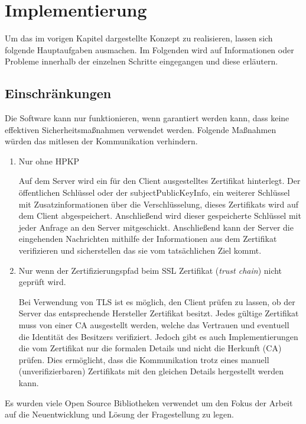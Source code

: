 \chapter{Implementierung}

Um das im vorigen Kapitel dargestellte Konzept zu realisieren, lassen sich folgende Hauptaufgaben ausmachen. Im Folgenden wird auf Informationen oder Probleme innerhalb der einzelnen Schritte eingegangen und diese erläutern.

\section{Einschränkungen}
Die Software kann nur funktionieren, wenn garantiert werden kann, dass keine effektiven Sicherheitsmaßnahmen verwendet werden. Folgende Maßnahmen würden das mitlesen der Kommunikation verhindern.
\begin{enumerate}
    \item Nur ohne \ac{HPKP} %
    
    Auf dem Server wird ein für den Client ausgestelltes Zertifikat hinterlegt. Der öffentlichen Schlüssel oder der \glqq subjectPublicKeyInfo\grqq{}, ein weiterer Schlüssel mit Zusatzinformationen über die Verschlüsselung, dieses Zertifikats wird auf dem Client abgespeichert. Anschließend wird dieser gespeicherte Schlüssel mit jeder Anfrage an den Server mitgeschickt. Anschließend kann der Server die eingehenden Nachrichten mithilfe der Informationen aus dem Zertifikat verifizieren und sicherstellen das sie vom tatsächlichen Ziel kommt.
    \item Nur wenn der Zertifizierungspfad beim SSL Zertifikat (\emph{trust chain}) nicht geprüft wird.
    
    Bei Verwendung von TLS ist es möglich, den Client prüfen zu lassen, ob der Server das entsprechende Hersteller Zertifikat besitzt. Jedes gültige Zertifikat muss von einer \ac{CA} ausgestellt werden, welche das Vertrauen und eventuell die Identität des Besitzers verifiziert. Jedoch gibt es auch Implementierungen die vom Zertifikat nur die formalen Details und nicht die Herkunft (CA) prüfen.
    Dies ermöglicht, dass die Kommunikation trotz eines manuell (unverifizierbaren) Zertifikats mit den gleichen Details hergestellt werden kann.
\end{enumerate}

Es wurden viele Open Source Bibliotheken verwendet um den Fokus der Arbeit auf die Neuentwicklung und Lösung der Fragestellung zu legen.

